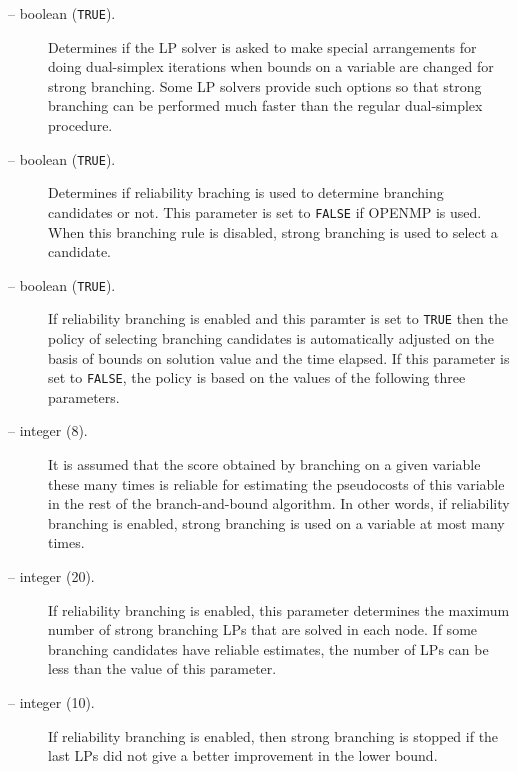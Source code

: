 \begin{description}
\item [ -- boolean ({\tt TRUE}).]
Determines if the LP solver is asked to make special arrangements for doing
dual-simplex iterations when bounds on a variable are changed for strong
branching. Some LP solvers provide such options so that strong branching can
be performed much faster than the regular dual-simplex procedure.

\item[ -- boolean ({\tt TRUE}).] 
Determines if reliability braching is used to determine branching candidates
or not. This parameter is set to {\tt FALSE} if OPENMP is used. When this
branching rule is disabled, strong branching is used to select a candidate.


\item[ -- boolean ({\tt TRUE}).]
If reliability branching is enabled and this paramter is set to {\tt TRUE} then the
policy of selecting branching candidates is automatically adjusted on the
basis of bounds on solution value and the time elapsed. If this parameter is
set to {\tt FALSE}, the policy is based on the values of the following three
parameters.

\item[ -- integer (8).] 
It is assumed that the score obtained by branching on a given variable these many
times is reliable for estimating the pseudocosts of this variable in the rest
of the branch-and-bound algorithm. In other words, if reliability branching is
enabled, strong branching is used on a variable at most
 many times.

\item[ -- integer (20).] 
If reliability branching is enabled, this parameter determines the maximum
number of strong branching LPs that are solved in each node. If some branching
candidates have reliable estimates, the number of LPs can be less than
the value of this parameter.

\item[ -- integer (10).] 
If reliability branching is enabled, then strong branching is stopped if the
last  LPs did not give a better improvement in
the lower bound.



\end{description}
